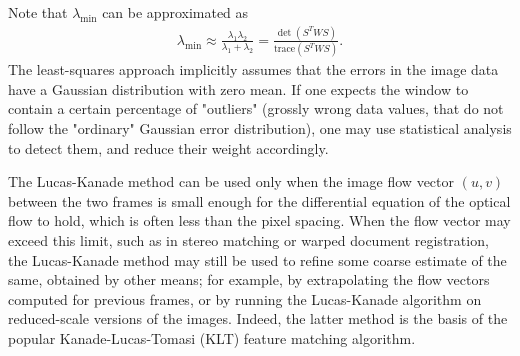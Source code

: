 \documentclass[letterpaper,11pt]{article}
\begin{document}
Note that $\lambda_{\min}$ can be approximated as
\begin{align}
\lambda_{\min} \approx \frac{\lambda_1 \lambda_2}{\lambda_1 + \lambda_2} = \frac{\det (S^T W S)}{\textrm{trace} (S^T W S)}.
\end{align}
The least-squares approach implicitly assumes that the errors in the image data have a Gaussian distribution with zero mean. If one expects the window to contain a certain percentage of "outliers" (grossly wrong data values, that do not follow the "ordinary" Gaussian error distribution), one may use statistical analysis to detect them, and reduce their weight accordingly.

The Lucas-Kanade method can be used only when the image flow vector $(u,v)$ between the two frames is small enough for the differential equation of the optical flow to hold, which is often less than the pixel spacing. When the flow vector may exceed this limit, such as in stereo matching or warped document registration, the Lucas-Kanade method may still be used to refine some coarse estimate of the same, obtained by other means; for example, by extrapolating the flow vectors computed for previous frames, or by running the Lucas-Kanade algorithm on reduced-scale versions of the images. Indeed, the latter method is the basis of the popular Kanade-Lucas-Tomasi (KLT) feature matching algorithm.
\end{document}
